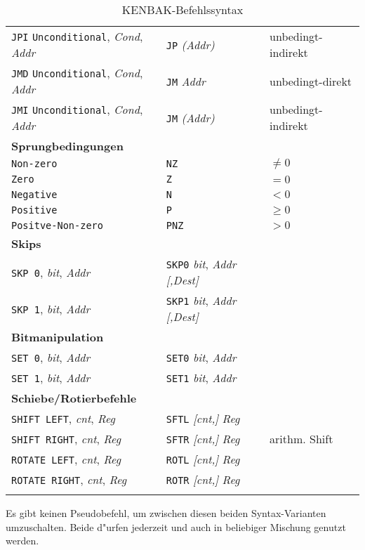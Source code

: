 \documentclass[12pt,a4paper,twoside]{report}
\begin{document}
\begin{center}
\begin{longtable}{|l|l|l|}
{\tt JPI} {\tt Unconditional}, {\it Cond}, {\it Addr} & {\tt JP} {\it (Addr)} & unbedingt-indirekt \\
{\tt JMD} {\tt Unconditional}, {\it Cond}, {\it Addr} & {\tt JM} {\it Addr} & unbedingt-direkt \\
{\tt JMI} {\tt Unconditional}, {\it Cond}, {\it Addr} & {\tt JM} {\it (Addr)} & unbedingt-indirekt \\
\hline
\multicolumn{3}{|l|}{\bf Sprungbedingungen} \\
\hline
{\tt Non-zero} & {\tt NZ} & $\neq 0$ \\
{\tt Zero} & {\tt Z} & $= 0$ \\
{\tt Negative} & {\tt N} & $< 0$ \\
{\tt Positive} & {\tt P} & $\geq 0$ \\
{\tt Positve-Non-zero} & {\tt PNZ} & $ > 0$ \\
\hline
\multicolumn{3}{|l|}{\bf Skips} \\
\hline
{\tt SKP 0}, {\it bit}, {\it Addr} & {\tt SKP0} {\it bit}, {\it Addr} {\it [,Dest]} & \\
{\tt SKP 1}, {\it bit}, {\it Addr} & {\tt SKP1} {\it bit}, {\it Addr} {\it [,Dest]} & \\
\hline
\multicolumn{3}{|l|}{\bf Bitmanipulation} \\
\hline
{\tt SET 0}, {\it bit}, {\it Addr} & {\tt SET0} {\it bit}, {\it Addr} & \\
{\tt SET 1}, {\it bit}, {\it Addr} & {\tt SET1} {\it bit}, {\it Addr} & \\
\hline
\multicolumn{3}{|l|}{\bf Schiebe/Rotierbefehle} \\
\hline
{\tt SHIFT LEFT}, {\it cnt}, {\it Reg} & {\tt SFTL} {\it [cnt,]} {\it Reg} & \\
{\tt SHIFT RIGHT}, {\it cnt}, {\it Reg} & {\tt SFTR} {\it [cnt,]} {\it Reg} & arithm. Shift \\
{\tt ROTATE LEFT}, {\it cnt}, {\it Reg} & {\tt ROTL} {\it [cnt,]} {\it Reg} & \\
{\tt ROTATE RIGHT}, {\it cnt}, {\it Reg} & {\tt ROTR} {\it [cnt,]} {\it Reg} & \\
\hline
\caption{KENBAK-Befehlssyntax \label{TabKENBAKSyntax}}
\end{longtable}\end{center}
\hfuzz=0pt

Es gibt keinen Pseudobefehl, um zwischen diesen beiden Syntax-Varianten umzuschalten.
Beide d"urfen jederzeit und auch in beliebiger Mischung genutzt werden.
\end{document}
